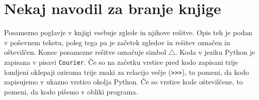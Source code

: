 \section{Nekaj navodil za branje knjige}
Posamezno poglavje v knjigi vsebuje zglede in njihove rešitve. Opis teh je podan v poševnem tekstu, poleg tega pa je začetek zgledov in rešitev označen in oštevilčen. Konec posamezne rešitve označuje simbol $\triangle$. Koda v jeziku Python je zapisana v pisavi \texttt{Courier}. Če so na začetku vrstice pred kodo zapisani trije lomljeni oklepaji oziroma trije znaki za relacijo večje (\texttt{>}\texttt{>}\texttt{>}), to pomeni, da kodo zapisujemo v ukazno vrstico okolja Python. Če so vrstice kode oštevilčene, to pomeni, da kodo pišemo v obliki programa. 

